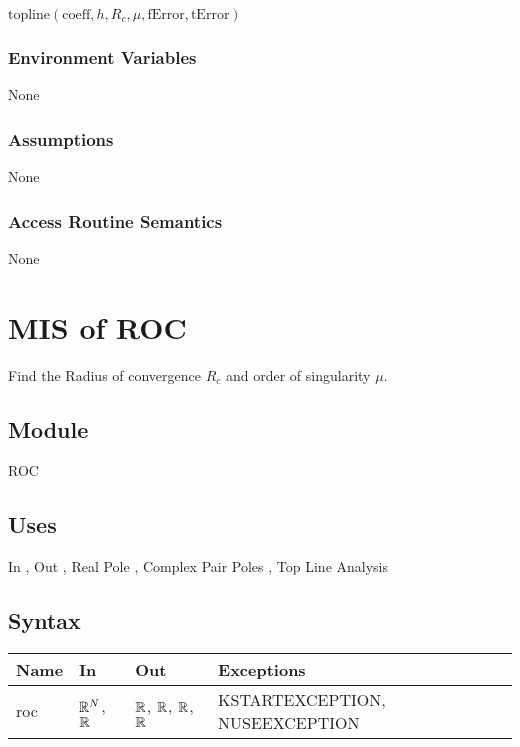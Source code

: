 \documentclass[12pt, titlepage]{article}
\begin{document}
\vspace{.3cm}

\Ni $\text{topline}( \text{coeff}, h, R_c, \mu, \text{fError}, \text{tError})$

\subsubsection{Environment Variables}

None

\subsubsection{Assumptions}

None

\subsubsection{Access Routine Semantics}

None


\newpage

\section{MIS of ROC} \label{sc:MIS_ROC}

Find the Radius of convergence $R_c$ and order of singularity $\mu$.

\subsection{Module}

ROC

\subsection{Uses}

In , Out ,
Real Pole ,
Complex Pair Poles ,
Top Line Analysis 

\subsection{Syntax}

\begin{tabular}{p{3cm} p{5cm} p{3cm} >{\raggedright\arraybackslash}p{5cm}}
\toprule
\textbf{Name} & \textbf{In} & \textbf{Out} & \textbf{Exceptions} \\
\midrule
  roc & $\mathbb{R}^N$, $\mathbb{R}$ &  $\mathbb{R}$, $\mathbb{R}$, $\mathbb{R}$, $\mathbb{R}$ & {\footnotesize KSTARTEXCEPTION, NUSEEXCEPTION} \\
\bottomrule
\end{tabular}
\end{document}
